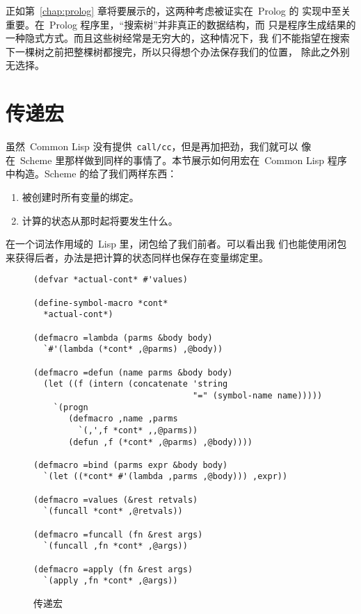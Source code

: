 正如第~\ref{chap:prolog} 章将要展示的，这两种考虑被证实在~Prolog 的
实现中至关重要。在~Prolog 程序里，“搜索树”并非真正的数据结构，而
只是程序生成结果的一种隐式方式。而且这些树经常是无穷大的，这种情况下，我
们不能指望在搜索下一棵树之前把整棵树都搜完，所以只得想个办法保存我们的位置，
除此之外别无选择。

\section{\continuation{}传递宏}
\label{sec:continuation-passing_macros}

虽然~Common Lisp 没有提供~\texttt{call/cc}，但是再加把劲，我们就可以
像在~Scheme 里那样做到同样的事情了。本节展示如何用宏在~Common Lisp 程序
中构造\continuation{}。Scheme 的\continuation{}给了我们两样东西：
\begin{enumerate}
\item \continuation{}被创建时所有变量的绑定。
\item 计算的状态\pozhehao{}从那时起将要发生什么。
\end{enumerate}
在一个词法作用域的~Lisp 里，闭包给了我们前者。可以看出我
们也能使用闭包来获得后者，办法是把计算的状态同样也保存在变量绑定里。

\begin{figure}
\begin{lstlisting}
(defvar *actual-cont* #'values)

(define-symbol-macro *cont*
  *actual-cont*)

(defmacro =lambda (parms &body body)
  `#'(lambda (*cont* ,@parms) ,@body))

(defmacro =defun (name parms &body body)
  (let ((f (intern (concatenate 'string
                                "=" (symbol-name name)))))
    `(progn
       (defmacro ,name ,parms
         `(,',f *cont* ,,@parms))
       (defun ,f (*cont* ,@parms) ,@body))))

(defmacro =bind (parms expr &body body)
  `(let ((*cont* #'(lambda ,parms ,@body))) ,expr))

(defmacro =values (&rest retvals)
  `(funcall *cont* ,@retvals))

(defmacro =funcall (fn &rest args)
  `(funcall ,fn *cont* ,@args))

(defmacro =apply (fn &rest args)
  `(apply ,fn *cont* ,@args))
\end{lstlisting}
  \caption{\continuation{}传递宏}
  \label{fig:continuation-passing_macros}
\end{figure}

